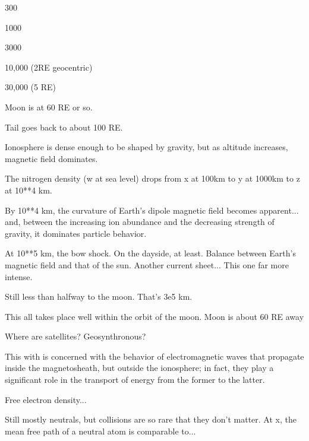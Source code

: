 

300

1000

3000

10,000 (2RE geocentric)

30,000 (5 RE)

Moon is at 60 RE or so. 

Tail goes back to about 100 RE. 

Ionosphere is dense enough to be shaped by gravity, but as altitude increases, magnetic field dominates.

The nitrogen density (w at sea level) drops from x at 100km to y at 1000km to z at 10**4 km.

By 10**4 km, the curvature of Earth's dipole magnetic field becomes apparent... and, between the increasing ion abundance and the decreasing strength of gravity, it dominates particle behavior.

At 10**5 km, the bow shock. On the dayside, at least. Balance between Earth's magnetic field and that of the sun. Another current sheet... This one far more intense.

Still less than halfway to the moon. That's 3e5 km.

This all takes place well within the orbit of the moon. Moon is about 60 RE away

Where are satellites? Geosynthronous? 

This with is concerned with the behavior of electromagnetic waves that propagate inside the magnetosheath, but outside the ionosphere; in fact, they play a significant role in the transport of energy from the former to the latter. 

Free electron density...

Still mostly neutrals, but collisions are so rare that they don't matter. At x, the mean free path of a neutral atom is comparable to... 


